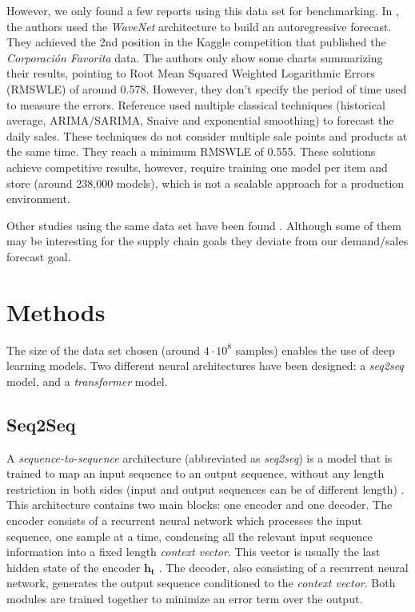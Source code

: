 \documentclass{elsarticle}
\begin{document}
	However, we only found a few reports using this data set for benchmarking. In \cite{kechyn2018}, the authors used the \textit{WaveNet} \cite{vanderoord2016} architecture to build an autoregressive forecast. They achieved the 2nd position in the Kaggle competition that published the \textit{Corporación Favorita} data. The authors only show some charts summarizing their results, pointing to Root Mean Squared Weighted Logarithmic Errors (RMSWLE) of around 0.578. However, they don't specify the period of time used to measure the errors. Reference \cite{Steves2018} used multiple classical techniques (historical average, ARIMA/SARIMA, Snaive and exponential smoothing) to forecast the daily sales. These techniques do not consider multiple sale points and products at the same time. They reach a minimum RMSWLE of 0.555. These solutions achieve competitive results, however, require training one model per item and store (around 238,000 models), which is not a scalable approach for a production environment.

	Other studies using the same data set have been found  \cite{Wang2020, Shaikhha2020, Schleich2019, Lim2019, Curtin2020, Malik2019, Kuleshov2018, Khamis2020}. Although some of them may be interesting for the supply chain goals they deviate from our demand/sales forecast goal.
	
	\section{Methods} \label{sec:methods}
	The size of the data set chosen (around $4\cdot10^8$ samples) enables the use of deep learning models. Two different neural architectures have been designed: a \textit{seq2seq} model, and a \textit{transformer} model.
	
	\subsection{Seq2Seq}  %
	A \textit{sequence-to-sequence} architecture (abbreviated as \textit{seq2seq}) is a model that is trained to map an input sequence to an output sequence, without any length restriction in both sides (input and output sequences can be of different length) \cite{sutskever2014}. This architecture contains two main blocks: one encoder and one decoder. The encoder consists of a recurrent neural network which processes the input sequence, one sample at a time, condensing all the relevant input sequence information into a fixed length \textit{context vector}. This vector is usually the last hidden state of the encoder $\mathbf{h_t}$ \cite{kamath2019}. The decoder, also consisting of a recurrent neural network, generates the output sequence conditioned to the \textit{context vector}. Both modules are trained together to minimize an error term over the output.
	 
\end{document}
